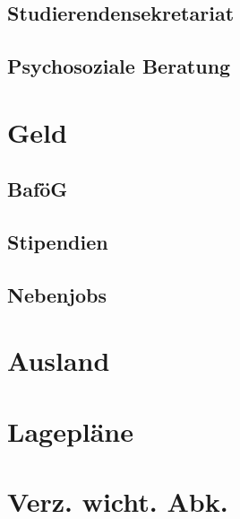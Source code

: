 \documentclass[12pt, a4paper]{article}
\newif\ifinfo
\begin{document}
	\subsection{Studierendensekretariat}
	

	\subsection{Psychosoziale Beratung}
	
\fi

\newpage
\section{Geld}

\subsection{BaföG}


\subsection{Stipendien}


\subsection{Nebenjobs}


\ifinfo
\newpage
\fi

\section{Ausland}


\newpage
%

\section{Lagepläne}
\ifinfo

\else

\fi 
\newpage


\section*{Verz. wicht. Abk.}

\ifinfo
\pagebreak
\fi 
\end{document}
